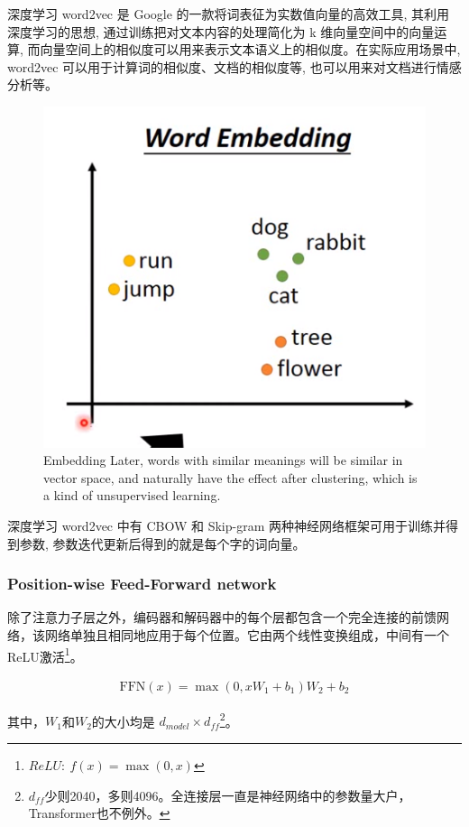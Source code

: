 \documentclass[letterpaper,10pt]{article}
\begin{document}
	深度学习 word2vec 是 Google 的一款将词表征为实数值向量的高效工具, 其利用深度学习的思想, 通过训练把对文本内容的处理简化为 k 维向量空间中的向量运算, 而向量空间上的相似度可以用来表示文本语义上的相似度。在实际应用场景中,  word2vec 可以用于计算词的相似度、文档的相似度等, 也可以用来对文档进行情感分析等。
	
	\begin{figure}[htbp]
		\centering 
		\includegraphics[width=0.5\columnwidth]{picture/word-embeding-2d}
		\captionsetup{font=scriptsize}
		\caption{
			\label{fig: word embeding 2d}Embedding Later, words with similar meanings will be similar in vector space, and naturally have the effect after clustering, which is a kind of unsupervised learning.
		}
	\end{figure}
	
	深度学习 word2vec 中有 CBOW 和 Skip-gram 两种神经网络框架可用于训练并得到参数, 参数迭代更新后得到的就是每个字的词向量。
	
	\subsubsection{Position-wise Feed-Forward network}
	
	除了注意力子层之外，编码器和解码器中的每个层都包含一个完全连接的前馈网络，该网络单独且相同地应用于每个位置。它由两个线性变换组成，中间有一个ReLU激活\footnote{$ReLU: \ f\left(x\right) = \max \left(0,x\right)$}。
	
	\begin{equation}
		\begin{aligned}
			\text{FFN}(x) = \max \left(0,xW_1+b_1\right)W_2 + b_2
		\end{aligned}
		\label{eq: Position-wise Feed-Forward network}
	\end{equation}
	
	其中，$W_1$和$W_2$的大小均是 $d_{model} \times d_{ff}$\footnote{$d_{ff}$少则2040，多则4096。全连接层一直是神经网络中的参数量大户，Transformer也不例外。}。
	
\end{document}
